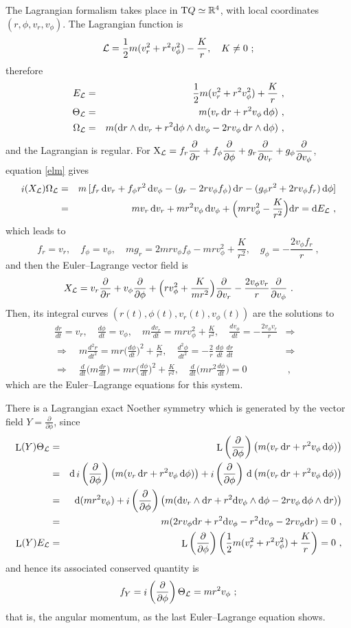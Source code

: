 \documentclass[12pt]{report}
\def\bea{\begin{eqnarray}}
\def\eea{\end{eqnarray}}
\def\beann{\begin{eqnarray*}}
\def\eeann{\end{eqnarray*}}
\def\dst{\displaystyle}
\def\derpar#1#2{\frac{\partial{#1}}{\partial{#2}}}
\def\Lag{{\cal L}}
\def\d{{\rm d}}
\def\Real{\mathbb{R}}
\def\X{{\rm X}}
\def\Tan{{\rm T}}
\def\Lie{\mathop{\rm L}\nolimits}
\def\inn{\mathop{i}\nolimits}
\begin{document}
The Lagrangian formalism takes place in $\Tan Q\simeq\Real^4$, with local coordinates 
$(r,\phi,v_r,v_\phi)$. The Lagrangian function is 
$$
\Lag=\frac{1}{2}m(v_r^2+r^2v_\phi^2)-\frac{K}{r} ,\quad K\not=0 \ ;
$$
therefore
\beann
E_\Lag&=&\frac{1}{2}m(v_r^2+r^2v_\phi^2)+\frac{K}{r} \ , \\
\Theta_\Lag&=&m(v_r\,\d r+r^2v_\phi\,\d\phi) \ , \\
\Omega_\Lag&=&m(\d r\wedge\d v_r+r^2\d\phi\wedge\d v_\phi-
2rv_\phi\,\d r\wedge\d \phi) \ ,
\eeann
and the Lagrangian is regular.
For $\displaystyle \X_\Lag=f_r\derpar{}{r}+f_\phi\derpar{}{\phi}+
g_r\derpar{}{v_r}+g_\phi\derpar{}{v_\phi}$, 
equation \eqref{elm} gives
\beann
\inn(X_\Lag)\Omega_\Lag&=&
m\,[f_r\, \d v_r+f_\phi r^2\, \d v_\phi-(g_r-2rv_\phi f_\phi)\, \d r-
(g_\phi r^2+2rv_\phi f_r)\, \d\phi] \\
&=& mv_r\, \d v_r+mr^2v_\phi\, \d v_\phi+\Big(mrv_\phi^2-\frac{K}{r^2}\Big)\d r=\d E_\Lag \ ,
\eeann
which leads to
$$
f_r=v_r ,\quad f_\phi=v_\phi ,\quad 
mg_r=2mrv_\phi f_\phi-mrv_\phi^2+\frac{K}{r^2} ,\quad 
g_\phi=-\frac{2v_\phi f_r}{r}   \ ,
$$
and then the Euler--Lagrange vector field is
$$
X_\Lag=v_r\derpar{}{r}+v_\phi\derpar{}{\phi}+\Big(rv_\phi^2+\dst\frac{K}{mr^2}\Big)\derpar{}{v_r}
-\frac{2v_\phi v_r}{r}\derpar{}{v_\phi} \ .
$$
Then, its integral curves $(r(t),\phi(t),v_r(t),v_\phi(t))$ are the solutions to
\beann
\frac{dr}{dt} =v_r ,\quad \frac{d\phi}{dt} =v_\phi ,\quad
m\frac{dv_r}{dt}=mrv_\phi^2+\frac{K}{r^2}  ,\quad
\frac{dv_\phi}{dt}=-\frac{2v_\phi v_r}{r} &\Longrightarrow& \\
\Longrightarrow \quad m\frac{d^2r}{dt^2}=mr\Big(\frac{d\phi}{dt}\Big)^2+\frac{K}{r^2}  
,\quad  \frac{d^2\phi}{dt^2}=
-\frac{2}{r}\,\frac{d\phi}{dt}\,\frac{dr}{dt}
&\Longrightarrow& \\
\Longrightarrow \quad \frac{d}{dt}\Big(m\frac{dr}{dt}\Big)=mr\Big(\frac{d\phi}{dt}\Big)^2+\frac{K}{r^2}  
,\quad \frac{d}{dt}\Big(mr^2\frac{d\phi}{dt}\Big)=0 &\ , &
\eeann
which are the Euler--Lagrange equations for this system.

There is a Lagrangian exact Noether symmetry 
which is generated by the vector field $\dst Y=\derpar{}{\phi}$, 
since
\bea
\Lie(Y)\Theta_\Lag&=& 
\Lie\left(\derpar{}{\phi}\right)\left(m(v_r\,\d r+r^2v_\phi\,\d\phi)\right) 
\nonumber \\ &=&
\d\inn\left(\derpar{}{\phi}\right)\left(m(v_r\,\d r+r^2v_\phi\,\d\phi)\right)+
\inn\left(\derpar{}{\phi}\right)\,\d\left(m(v_r\,\d r+r^2v_\phi\,\d\phi)\right) 
\nonumber\\ &=&
\d(mr^2v_\phi)+\inn\left(\derpar{}{\phi}\right)
\left(m(\d v_r\wedge\d r+r^2\d v_\phi\wedge\d\phi-
2rv_\phi\,\d \phi\wedge\d r)\right) 
\nonumber \\ &=&
m(2rv_\phi\d r+r^2\d v_\phi-r^2\d v_\phi-2rv_\phi\d r)=0 \ , 
\label{NsymKep1} \\
\Lie(Y)E_\Lag&=& 
\Lie\left(\derpar{}{\phi}\right)\left(\frac{1}{2}m(v_r^2+r^2v_\phi^2)+\frac{K}{r}\right)=0 \ ,
\label{NsymKep2}
\eea
and hence its associated conserved quantity is
$$
f_Y=\inn\left(\derpar{}{\phi}\right)\Theta_\Lag=mr^2v_\phi \ ;
$$
that is, the angular momentum, as the last Euler--Lagrange equation shows.
\end{document}
